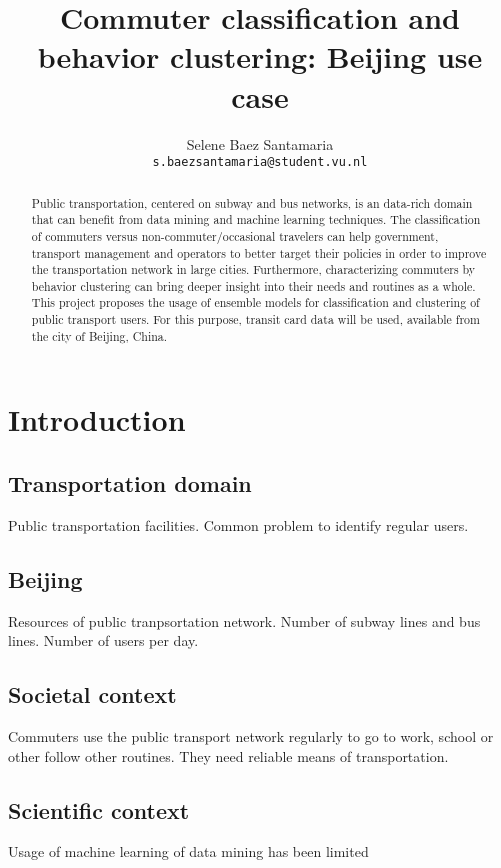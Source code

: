 \documentclass{article}
\title{Commuter classification and behavior clustering: Beijing use case}
\author{
  Selene Baez  Santamaria \\
  \texttt{s.baezsantamaria@student.vu.nl}
}
\begin{document}

\maketitle

\begin{abstract}
  Public transportation, centered on subway and bus networks, is an data-rich domain that can benefit from data mining and machine learning techniques. The classification of commuters versus non-commuter/occasional travelers can help government, transport management and operators to better target their policies in order to improve the transportation network in large cities. Furthermore, characterizing commuters by behavior clustering can bring deeper insight into their needs and routines as a whole. 
  This project proposes the usage of ensemble models for classification and clustering of public transport users. For this purpose, transit card data will be used, available from the city of Beijing, China. 
\end{abstract}

\section{Introduction}

\subsection{Transportation domain}
Public transportation facilities. Common problem to identify regular users. 

\subsection{Beijing}
Resources of public tranpsortation network. Number of subway lines and bus lines. Number of users per day.

\subsection{Societal context}
Commuters use the public transport network regularly to go to work, school or other follow other routines. They need reliable means of transportation.

\subsection{Scientific context}
Usage of machine learning of data mining has been limited
\end{document}
